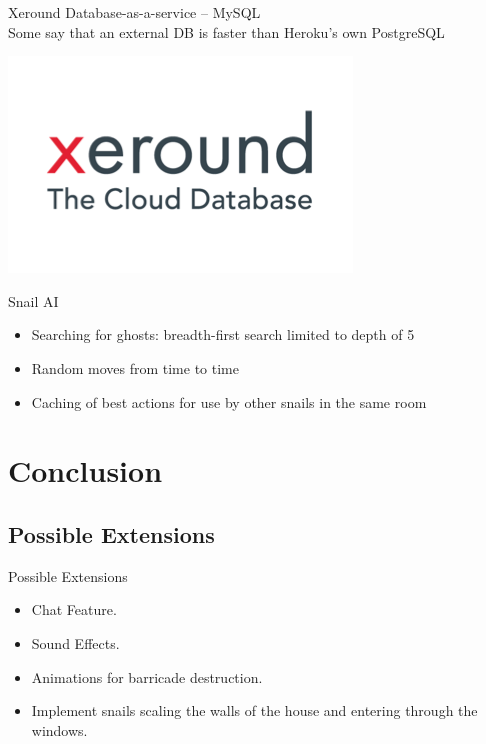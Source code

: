 \documentclass{beamer}
\begin{document}
\begin{frame}{Xeround}
  Database-as-a-service -- MySQL \\
  \vspace{\baselineskip}
  Some say that an external DB is faster than Heroku's own PostgreSQL
  \vspace{\baselineskip}
  \begin{center}
    \includegraphics[scale=0.25]{xeround.png} \\
  \end{center}
\end{frame}

\begin{frame}{Snail AI}
  \begin{itemize}
    \item Searching for ghosts: breadth-first search limited to depth of 5
    \vspace{\baselineskip}
    \item Random moves from time to time
    \vspace{\baselineskip}
    \item Caching of best actions for use by other snails in the same room
  \end{itemize}
\end{frame}


\section{Conclusion}
\subsection{Possible Extensions}

\begin{frame}{Possible Extensions}
  \begin{itemize}
    \item Chat Feature.
    \vspace{\baselineskip}
    \item Sound Effects.
    \vspace{\baselineskip}
    \item Animations for barricade destruction.
    \vspace{\baselineskip}
    \item Implement snails scaling the walls of the house and entering through the windows.
  \end{itemize}
\end{frame}
\end{document}
